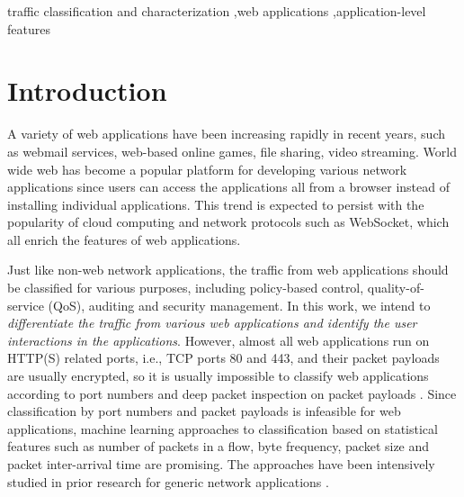 \documentclass[preprint,12pt]{elsarticle}
\begin{document}
\begin{frontmatter}
\begin{keyword}
traffic classification and characterization \sep web applications \sep application-level features


\end{keyword}

\end{frontmatter}


\section{Introduction}
\label{sec:intro}

A variety of web applications have been increasing rapidly in recent years, such as webmail services, web-based online games, file sharing, video streaming. World wide web has become a popular platform for developing various network applications since users can access the applications all from a browser instead of installing individual applications. This trend is expected to persist with the popularity of cloud computing and network protocols such as WebSocket, which all enrich the features of web applications.   
	
Just like non-web network applications, the traffic from web applications should be classified for various purposes, including policy-based control, quality-of-service (QoS), auditing and security management. In this work, we intend to \emph{differentiate the traffic from various web applications and identify the user interactions in the applications}. However, almost all web applications run on HTTP(S) related ports, i.e., TCP ports 80 and 443, and their packet payloads are usually encrypted, so it is usually impossible to classify web applications according to port numbers and deep packet inspection on packet payloads \cite{ASO08,PIO13}. Since classification by port numbers and packet payloads is infeasible for web applications, machine learning approaches to classification based on statistical features such as number of packets in a flow, byte frequency, packet size and packet inter-arrival time are promising. The approaches have been intensively studied in prior research for generic network applications \cite{COS04}.
\end{document}
